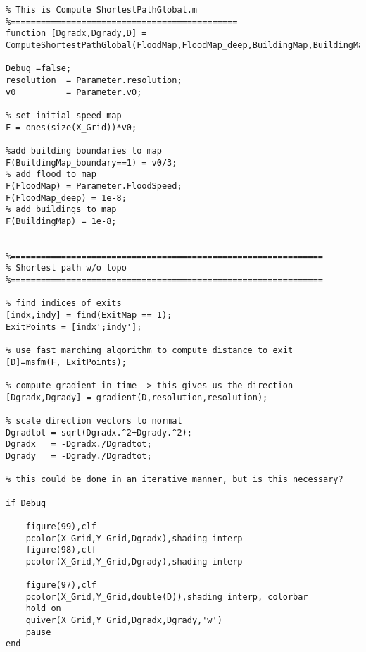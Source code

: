 \lstset{basicstyle=\footnotesize\ttfamily}
    
\begin{lstlisting}[breaklines]
%=============================================
% This is Compute ShortestPathGlobal.m
%=============================================
function [Dgradx,Dgrady,D] = ComputeShortestPathGlobal(FloodMap,FloodMap_deep,BuildingMap,BuildingMap_boundary,ExitMap,X_Grid,Y_Grid,Parameter)

Debug =false;
resolution  = Parameter.resolution;
v0          = Parameter.v0;

% set initial speed map
F = ones(size(X_Grid))*v0;

%add building boundaries to map
F(BuildingMap_boundary==1) = v0/3;
% add flood to map
F(FloodMap) = Parameter.FloodSpeed;
F(FloodMap_deep) = 1e-8;
% add buildings to map
F(BuildingMap) = 1e-8;


%==============================================================
% Shortest path w/o topo
%==============================================================

% find indices of exits
[indx,indy] = find(ExitMap == 1);
ExitPoints = [indx';indy'];

% use fast marching algorithm to compute distance to exit
[D]=msfm(F, ExitPoints);

% compute gradient in time -> this gives us the direction
[Dgradx,Dgrady] = gradient(D,resolution,resolution);

% scale direction vectors to normal
Dgradtot = sqrt(Dgradx.^2+Dgrady.^2);
Dgradx   = -Dgradx./Dgradtot;
Dgrady   = -Dgrady./Dgradtot;

% this could be done in an iterative manner, but is this necessary?

if Debug

    figure(99),clf
    pcolor(X_Grid,Y_Grid,Dgradx),shading interp
    figure(98),clf
    pcolor(X_Grid,Y_Grid,Dgrady),shading interp

    figure(97),clf
    pcolor(X_Grid,Y_Grid,double(D)),shading interp, colorbar
    hold on
    quiver(X_Grid,Y_Grid,Dgradx,Dgrady,'w')
    pause
end
\end{lstlisting}